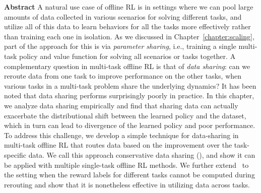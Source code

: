 \documentclass[../thesis.tex]{subfiles}
\begin{document}

\vspace{-0.4cm}
\begin{AIbox}{\large{\textbf{Abstract}}}
\vspace{4mm}
A natural use case of offline RL is in settings where we can pool large amounts of data collected in various scenarios for solving different tasks, and utilize all of this data to learn behaviors for all the tasks more effectively rather than training each one in isolation. As we discussed in Chapter~\ref{chapter:scaling}, part of the approach for this is via \emph{parameter sharing}, i.e., training a single multi-task policy and value function for solving all scenarios or tasks together. A complementary question in multi-task offline RL is that of \emph{data sharing}: can we reroute data from one task to improve performance on the other tasks, when various tasks in a multi-task problem share the underlying dynamics? It has been noted that data sharing performs surprisingly poorly in practice. In this chapter, we analyze data sharing empirically and find that sharing data can actually exacerbate the distributional shift between the learned policy and the dataset, which in turn can lead to divergence of the learned policy and poor performance. To address this challenge, we develop a simple technique for data-sharing in multi-task offline RL that routes data based on the improvement over the task-specific data. We call this approach conservative data sharing (\cdsmethodname), and show it can be applied with multiple single-task offline RL methods. We further extend \cdsmethodname\ to the setting when the reward labels for different tasks cannot be computed during rerouting and show that it is nonetheless effective in utilizing data across tasks. 
\vspace{2mm}
\end{AIbox}
\end{document}

